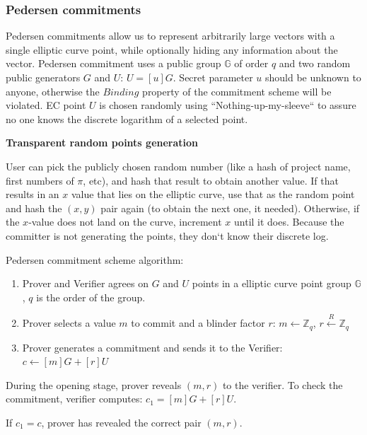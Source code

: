 \documentclass[../lecture-notes.tex]{subfiles}
\begin{document}
\subsubsection{Pedersen commitments}

Pedersen commitments allow us to represent arbitrarily large vectors with a single elliptic curve point, while optionally hiding any information about the vector. Pedersen commitment uses a public group $\mathbb{G}$ of order $q$ and two random public generators $G$ and $U$: $U = [u]G$. Secret parameter $u$ should be unknown to anyone, otherwise the $\textit{Binding}$ property of the commitment scheme will be violated.
EC point $U$ is chosen randomly using ``Nothing-up-my-sleeve`` to assure no one knows the discrete logarithm of a selected point.

\begin{remark}
    \textbf{Transparent random points generation}

    User can pick the publicly chosen random number (like a hash of project name, first numbers of $\pi$, etc), and hash that result to obtain another value. If that results in an $x$ value that lies on the elliptic curve, use that as the random point and hash the $(x, y)$ pair again (to obtain the next one, it needed). Otherwise, if the $x$-value does not land on the curve, increment $x$ until it does. Because the committer is not generating the points, they don`t know their discrete log. 
\end{remark}

Pedersen commitment scheme algorithm:
\begin{enumerate}
    \item Prover and Verifier agrees on $G$ and $U$ points in a elliptic curve point group $\mathbb{G}$, $q$ is the order of the group.
    \item Prover selects a value $m$ to commit and a blinder factor $r$:
            $m \leftarrow \mathbb{Z}_q$,
            $r \xleftarrow{R} \mathbb{Z}_q$
    \item Prover generates a commitment and sends it to the Verifier:
            $c \gets [m]G + [r]U$
\end{enumerate}

During the opening stage, prover reveals $(m, r)$ to the verifier. 
To check the commitment, verifier computes: $c_1 = [m]G + [r]U$.

If $c_1 = c$, prover has revealed the correct pair $(m, r)$.
\end{document}
